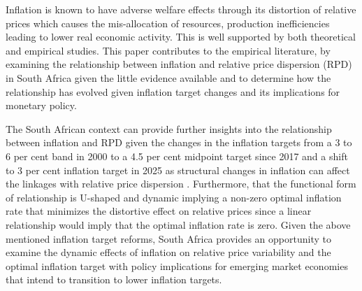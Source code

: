 \documentclass[
  letterpaper,
  DIV=11,
  numbers=noendperiod]{scrartcl}
\begin{document}
Inflation is known to have adverse welfare effects through its
distortion of relative prices which causes the mis-allocation of
resources, production inefficiencies leading to lower real economic
activity. This is well supported by both theoretical and empirical
studies. This paper contributes to the empirical literature, by
examining the relationship between inflation and relative price
dispersion (RPD) in South Africa given the little evidence available and
to determine how the relationship has evolved given inflation target
changes and its implications for monetary policy.

The South African context can provide further insights into the
relationship between inflation and RPD given the changes in the
inflation targets from a 3 to 6 per cent band in 2000 to a 4.5 per cent
midpoint target since 2017 and a shift to 3 per cent inflation target in
2025 as structural changes in inflation can affect the linkages with
relative price dispersion \citep{caglayan2003}. Furthermore, that the
functional form of relationship is U-shaped and dynamic
\citep{fielding2000, choi2010} implying a non-zero optimal inflation
rate that minimizes the distortive effect on relative prices since a
linear relationship would imply that the optimal inflation rate is zero.
Given the above mentioned inflation target reforms, South Africa
provides an opportunity to examine the dynamic effects of inflation on
relative price variability and the optimal inflation target with policy
implications for emerging market economies that intend to transition to
lower inflation targets.
\end{document}
